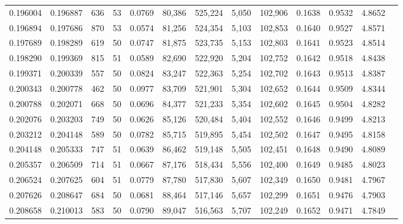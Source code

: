 \begin{tabular}{rrrrrrrrrrrrr}
0.196004 & 0.196887 &   636 &  53 &                                     0.0769 &  80,386 & 525,224 &   5,050 & 102,906 & 0.1638 & 0.9532 & 4.8652 \\
0.196894 & 0.197686 &   870 &  53 &                                     0.0574 &  81,256 & 524,354 &   5,103 & 102,853 & 0.1640 & 0.9527 & 4.8571 \\
0.197689 & 0.198289 &   619 &  50 &                                     0.0747 &  81,875 & 523,735 &   5,153 & 102,803 & 0.1641 & 0.9523 & 4.8514 \\
0.198290 & 0.199369 &   815 &  51 &                                     0.0589 &  82,690 & 522,920 &   5,204 & 102,752 & 0.1642 & 0.9518 & 4.8438 \\
0.199371 & 0.200339 &   557 &  50 &                                     0.0824 &  83,247 & 522,363 &   5,254 & 102,702 & 0.1643 & 0.9513 & 4.8387 \\
0.200343 & 0.200778 &   462 &  50 &                                     0.0977 &  83,709 & 521,901 &   5,304 & 102,652 & 0.1644 & 0.9509 & 4.8344 \\
0.200788 & 0.202071 &   668 &  50 &                                     0.0696 &  84,377 & 521,233 &   5,354 & 102,602 & 0.1645 & 0.9504 & 4.8282 \\
0.202076 & 0.203203 &   749 &  50 &                                     0.0626 &  85,126 & 520,484 &   5,404 & 102,552 & 0.1646 & 0.9499 & 4.8213 \\
0.203212 & 0.204148 &   589 &  50 &                                     0.0782 &  85,715 & 519,895 &   5,454 & 102,502 & 0.1647 & 0.9495 & 4.8158 \\
0.204148 & 0.205333 &   747 &  51 &                                     0.0639 &  86,462 & 519,148 &   5,505 & 102,451 & 0.1648 & 0.9490 & 4.8089 \\
0.205357 & 0.206509 &   714 &  51 &                                     0.0667 &  87,176 & 518,434 &   5,556 & 102,400 & 0.1649 & 0.9485 & 4.8023 \\
0.206524 & 0.207625 &   604 &  51 &                                     0.0779 &  87,780 & 517,830 &   5,607 & 102,349 & 0.1650 & 0.9481 & 4.7967 \\
0.207626 & 0.208647 &   684 &  50 &                                     0.0681 &  88,464 & 517,146 &   5,657 & 102,299 & 0.1651 & 0.9476 & 4.7903 \\
0.208658 & 0.210013 &   583 &  50 &                                     0.0790 &  89,047 & 516,563 &   5,707 & 102,249 & 0.1652 & 0.9471 & 4.7849 \\

\end{tabular}
